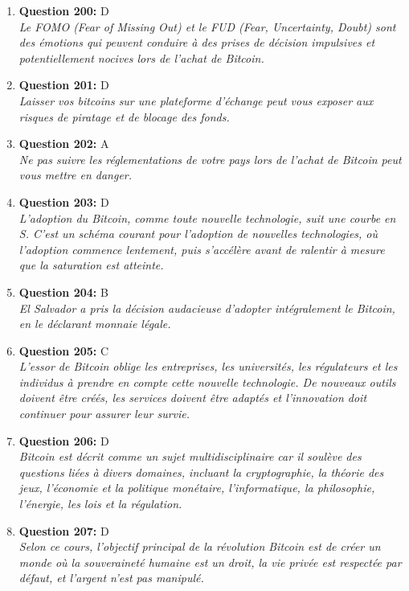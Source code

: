 \documentclass[12pt,a4paper]{article}
\begin{document}
\begin{enumerate}
\item \textbf{Question 200:} D
\\ \textit{Le FOMO (Fear of Missing Out) et le FUD (Fear, Uncertainty, Doubt) sont des émotions qui peuvent conduire à des prises de décision impulsives et potentiellement nocives lors de l'achat de Bitcoin.}

\item \textbf{Question 201:} D
\\ \textit{Laisser vos bitcoins sur une plateforme d'échange peut vous exposer aux risques de piratage et de blocage des fonds.}

\item \textbf{Question 202:} A
\\ \textit{Ne pas suivre les réglementations de votre pays lors de l'achat de Bitcoin peut vous mettre en danger.}

\item \textbf{Question 203:} D
\\ \textit{L'adoption du Bitcoin, comme toute nouvelle technologie, suit une courbe en S. C'est un schéma courant pour l'adoption de nouvelles technologies, où l'adoption commence lentement, puis s'accélère avant de ralentir à mesure que la saturation est atteinte.}

\item \textbf{Question 204:} B
\\ \textit{El Salvador a pris la décision audacieuse d'adopter intégralement le Bitcoin, en le déclarant monnaie légale.}

\item \textbf{Question 205:} C
\\ \textit{L'essor de Bitcoin oblige les entreprises, les universités, les régulateurs et les individus à prendre en compte cette nouvelle technologie. De nouveaux outils doivent être créés, les services doivent être adaptés et l'innovation doit continuer pour assurer leur survie.}

\item \textbf{Question 206:} D
\\ \textit{Bitcoin est décrit comme un sujet multidisciplinaire car il soulève des questions liées à divers domaines, incluant la cryptographie, la théorie des jeux, l'économie et la politique monétaire, l'informatique, la philosophie, l'énergie, les lois et la régulation.}

\item \textbf{Question 207:} D
\\ \textit{Selon ce cours, l'objectif principal de la révolution Bitcoin est de créer un monde où la souveraineté humaine est un droit, la vie privée est respectée par défaut, et l'argent n'est pas manipulé.}


\end{enumerate}
\end{document}
